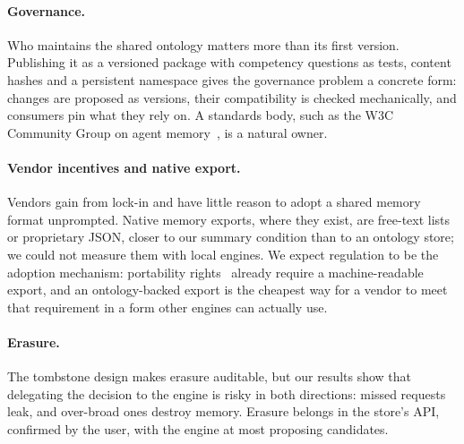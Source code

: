 \paragraph{Governance.} Who maintains the shared ontology matters more than its first version.
Publishing it as a versioned package with competency questions as tests, content hashes and a
persistent namespace gives the governance problem a concrete form: changes are proposed as
versions, their compatibility is checked mechanically, and consumers pin what they rely on.
A standards body, such as the W3C Community Group on agent memory~\cite{w3cmemcg2026}, is a
natural owner.

\paragraph{Vendor incentives and native export.} Vendors gain from lock-in and have little reason
to adopt a shared memory format unprompted. Native memory exports, where they exist, are free-text
lists or proprietary JSON, closer to our summary condition than to an ontology store; we could not
measure them with local engines. We expect regulation to be the adoption mechanism: portability
rights~\cite{gdpr,quebec25} already require a machine-readable export, and an ontology-backed export
is the cheapest way for a vendor to meet that requirement in a form other engines can actually use.

\paragraph{Erasure.} The tombstone design makes erasure auditable, but our results show that
delegating the decision to the engine is risky in both directions: missed requests leak, and
over-broad ones destroy memory. Erasure belongs in the store's API, confirmed by the user, with the
engine at most proposing candidates.
